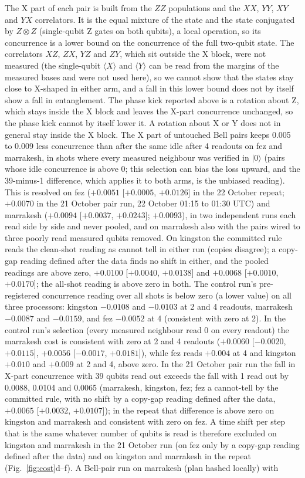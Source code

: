 \documentclass[reprint,amsmath,amssymb,aps,superscriptaddress,nofootinbib]{revtex4-2}
\begin{document}
The X part of each pair is built from the $ZZ$ populations and the $XX$, $YY$, $XY$ and $YX$ correlators. It is the equal mixture of the state and the state conjugated by $Z\otimes Z$ (single-qubit Z gates on both qubits), a local operation, so its concurrence is a lower bound on the concurrence of the full two-qubit state. The correlators $XZ$, $ZX$, $YZ$ and $ZY$, which sit outside the X block, were not measured (the single-qubit $\langle X\rangle$ and $\langle Y\rangle$ can be read from the margins of the measured bases and were not used here), so we cannot show that the states stay close to X-shaped in either arm, and a fall in this lower bound does not by itself show a fall in entanglement. The phase kick reported above is a rotation about Z, which stays inside the X block and leaves the X-part concurrence unchanged, so the phase kick cannot by itself lower it. A rotation about X or Y does not in general stay inside the X block. The X part of untouched Bell pairs keeps 0.005 to 0.009 less concurrence than after the same idle after 4 readouts on fez and marrakesh, in shots where every measured neighbour was verified in $|0\rangle$ (pairs whose idle concurrence is above 0; this selection can bias the loss upward, and the 39-minus-1 difference, which applies it to both arms, is the unbiased reading). This is resolved on fez ($+0.0051$ [$+0.0005$, $+0.0126$] in the 22 October repeat; $+0.0070$ in the 21 October pair run, 22 October 01:15 to 01:30 UTC) and marrakesh ($+0.0094$ [$+0.0037$, $+0.0243$]; $+0.0093$), in two independent runs each read side by side and never pooled, and on marrakesh also with the pairs wired to three poorly read measured qubits removed. On kingston the committed rule reads the clean-shot reading as cannot tell in either run (copies disagree); a copy-gap reading defined after the data finds no shift in either, and the pooled readings are above zero, $+0.0100$ [$+0.0040$, $+0.0138$] and $+0.0068$ [$+0.0010$, $+0.0170$]; the all-shot reading is above zero in both. The control run's pre-registered concurrence reading over all shots is below zero (a lower value) on all three processors: kingston $-0.0108$ and $-0.0103$ at 2 and 4 readouts, marrakesh $-0.0087$ and $-0.0159$, and fez $-0.0052$ at 4 (consistent with zero at 2). In the control run's selection (every measured neighbour read 0 on every readout) the marrakesh cost is consistent with zero at 2 and 4 readouts ($+0.0060$ [$-0.0020$, $+0.0115$], $+0.0056$ [$-0.0017$, $+0.0181$]), while fez reads $+0.004$ at 4 and kingston $+0.010$ and $+0.009$ at 2 and 4, above zero. In the 21 October pair run the fall in X-part concurrence with 39 qubits read out exceeds the fall with 1 read out by 0.0088, 0.0104 and 0.0065 (marrakesh, kingston, fez; fez a cannot-tell by the committed rule, with no shift by a copy-gap reading defined after the data, $+0.0065$ [$+0.0032$, $+0.0107$]); in the repeat that difference is above zero on kingston and marrakesh and consistent with zero on fez. A time shift per step that is the same whatever number of qubits is read is therefore excluded on kingston and marrakesh in the 21 October run (on fez only by a copy-gap reading defined after the data) and on kingston and marrakesh in the repeat (Fig.~\ref{fig:cost}d--f). A Bell-pair run on marrakesh (plan hashed locally) with 
\end{document}
